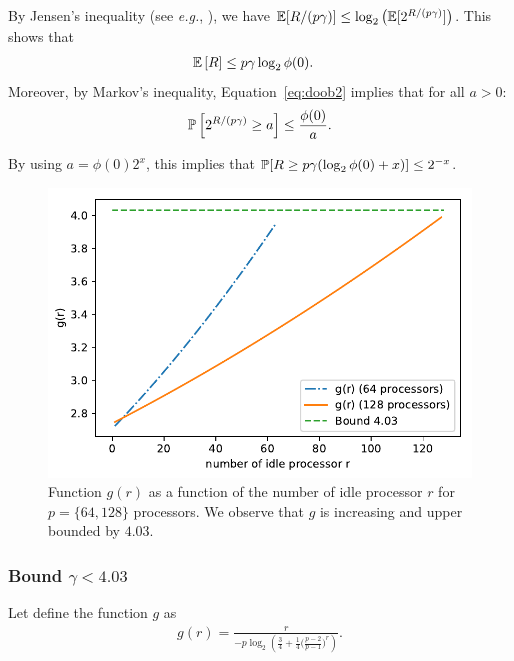   By Jensen's inequality (see \emph{e.g.},
  \cite[Equation~(3.2)]{durrett1996probability}), we have
  $\esp{R/(p\gamma)}\le\log_2\left(\esp{2^{R/(p\gamma)}}\right)$. This
  shows that
  \begin{align*}
       \esp{R} &\le p\gamma \log_2\phi(0).
   \end{align*}
   Moreover, by Markov's inequality, Equation~\eqref{eq:doob2} implies
   that for all $a>0$:
   \begin{align*}
     \Proba{2^{R/(p\gamma)}\ge a} \le \frac{\phi(0)}{a}.
   \end{align*}
   
   By using $a=\phi(0)2^{x}$, this implies that $\Proba{R \ge p\gamma (\log_2 \phi(0)  + x) } \le 2^{-x}$.

 \begin{figure}[t]
   \centering
   \includegraphics[width=.7\linewidth]{figures/g64}
   \caption{Function $g(r)$ as a function of the number of idle
     processor $r$ for $p=\{64,128\}$ processors. We observe that $g$ is
     increasing and upper bounded by $4.03$. }
   \label{fig:g}
 \end{figure}

 \bigskip

 \subsubsection{Bound $\gamma<4.03$}
   Let define the function $g$ as
   \begin{align}
     \label{eq:g}
     g(r)=\frac{r}{-p\log_2\left(\frac34+\frac14\Big(\frac{p-2}{p-1}\Big)^{r}\right)}.
   \end{align}
   
